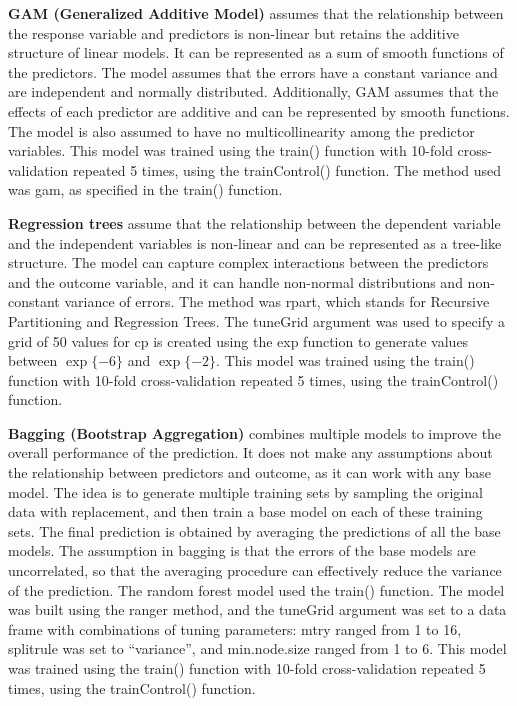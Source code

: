 \documentclass[
]{article}
\begin{document}
\textbf{GAM (Generalized Additive Model)} assumes that the relationship
between the response variable and predictors is non-linear but retains
the additive structure of linear models. It can be represented as a sum
of smooth functions of the predictors. The model assumes that the errors
have a constant variance and are independent and normally distributed.
Additionally, GAM assumes that the effects of each predictor are
additive and can be represented by smooth functions. The model is also
assumed to have no multicollinearity among the predictor variables. This
model was trained using the train() function with 10-fold
cross-validation repeated 5 times, using the trainControl() function.
The method used was gam, as specified in the train() function.

\textbf{Regression trees} assume that the relationship between the
dependent variable and the independent variables is non-linear and can
be represented as a tree-like structure. The model can capture complex
interactions between the predictors and the outcome variable, and it can
handle non-normal distributions and non-constant variance of errors. The
method was rpart, which stands for Recursive Partitioning and Regression
Trees. The tuneGrid argument was used to specify a grid of 50 values for
cp is created using the exp function to generate values between
\(\exp\{-6\}\) and \(\exp\{-2\}\). This model was trained using the
train() function with 10-fold cross-validation repeated 5 times, using
the trainControl() function.

\textbf{Bagging (Bootstrap Aggregation)} combines multiple models to
improve the overall performance of the prediction. It does not make any
assumptions about the relationship between predictors and outcome, as it
can work with any base model. The idea is to generate multiple training
sets by sampling the original data with replacement, and then train a
base model on each of these training sets. The final prediction is
obtained by averaging the predictions of all the base models. The
assumption in bagging is that the errors of the base models are
uncorrelated, so that the averaging procedure can effectively reduce the
variance of the prediction. The random forest model used the train()
function. The model was built using the ranger method, and the tuneGrid
argument was set to a data frame with combinations of tuning parameters:
mtry ranged from 1 to 16, splitrule was set to ``variance'', and
min.node.size ranged from 1 to 6. This model was trained using the
train() function with 10-fold cross-validation repeated 5 times, using
the trainControl() function.
\end{document}
